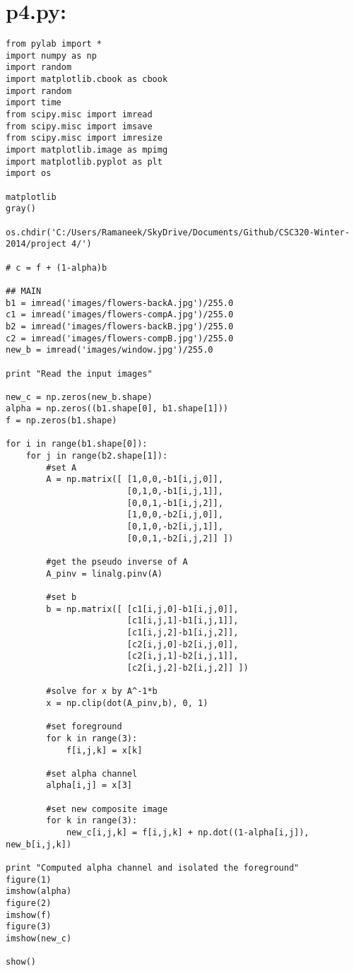 \documentclass{article}
\begin{document}
\section{p4.py:}
\begin{lstlisting}
from pylab import *
import numpy as np
import random
import matplotlib.cbook as cbook
import random
import time
from scipy.misc import imread
from scipy.misc import imsave
from scipy.misc import imresize
import matplotlib.image as mpimg
import matplotlib.pyplot as plt
import os

matplotlib
gray()

os.chdir('C:/Users/Ramaneek/SkyDrive/Documents/Github/CSC320-Winter-2014/project 4/')

# c = f + (1-alpha)b

## MAIN
b1 = imread('images/flowers-backA.jpg')/255.0
c1 = imread('images/flowers-compA.jpg')/255.0
b2 = imread('images/flowers-backB.jpg')/255.0
c2 = imread('images/flowers-compB.jpg')/255.0
new_b = imread('images/window.jpg')/255.0

print "Read the input images"

new_c = np.zeros(new_b.shape)
alpha = np.zeros((b1.shape[0], b1.shape[1]))
f = np.zeros(b1.shape)

for i in range(b1.shape[0]):
    for j in range(b2.shape[1]):
        #set A
        A = np.matrix([ [1,0,0,-b1[i,j,0]], 
                        [0,1,0,-b1[i,j,1]], 
                        [0,0,1,-b1[i,j,2]], 
                        [1,0,0,-b2[i,j,0]], 
                        [0,1,0,-b2[i,j,1]], 
                        [0,0,1,-b2[i,j,2]] ])
                        
        #get the pseudo inverse of A
        A_pinv = linalg.pinv(A)
        
        #set b
        b = np.matrix([ [c1[i,j,0]-b1[i,j,0]], 
                        [c1[i,j,1]-b1[i,j,1]], 
                        [c1[i,j,2]-b1[i,j,2]],
                        [c2[i,j,0]-b2[i,j,0]], 
                        [c2[i,j,1]-b2[i,j,1]], 
                        [c2[i,j,2]-b2[i,j,2]] ])
                        
        #solve for x by A^-1*b
        x = np.clip(dot(A_pinv,b), 0, 1)
        
        #set foreground
        for k in range(3):
            f[i,j,k] = x[k]
        
        #set alpha channel
        alpha[i,j] = x[3]
        
        #set new composite image
        for k in range(3):
            new_c[i,j,k] = f[i,j,k] + np.dot((1-alpha[i,j]), new_b[i,j,k])

print "Computed alpha channel and isolated the foreground"
figure(1)
imshow(alpha)
figure(2)
imshow(f)
figure(3)
imshow(new_c)

show()

            
\end{lstlisting}
\end{document}
